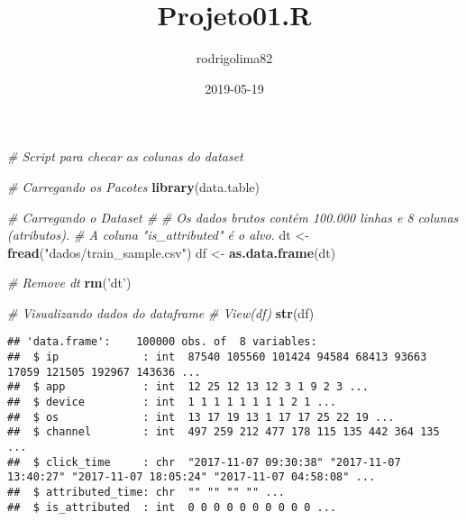 \documentclass[]{article}
\title{Projeto01.R}
\author{rodrigolima82}
\date{2019-05-19}
\newenvironment{Shaded}{\begin{snugshade}}{\end{snugshade}}
\newcommand{\CommentTok}[1]{\textcolor[rgb]{0.56,0.35,0.01}{\textit{#1}}}
\newcommand{\KeywordTok}[1]{\textcolor[rgb]{0.13,0.29,0.53}{\textbf{#1}}}
\newcommand{\NormalTok}[1]{#1}
\newcommand{\StringTok}[1]{\textcolor[rgb]{0.31,0.60,0.02}{#1}}
\begin{document}
\maketitle

\begin{Shaded}
\begin{Highlighting}[]
\CommentTok{# Script para checar as colunas do dataset}

\CommentTok{# Carregando os Pacotes}
\KeywordTok{library}\NormalTok{(data.table)}

\CommentTok{# Carregando o Dataset # }
\CommentTok{# Os dados brutos contém 100.000 linhas e 8 colunas (atributos). }
\CommentTok{# A coluna "is_attributed" é o alvo.}
\NormalTok{dt <-}\StringTok{ }\KeywordTok{fread}\NormalTok{(}\StringTok{"dados/train_sample.csv"}\NormalTok{)}
\NormalTok{df <-}\StringTok{ }\KeywordTok{as.data.frame}\NormalTok{(dt)}

\CommentTok{# Remove dt}
\KeywordTok{rm}\NormalTok{(}\StringTok{'dt'}\NormalTok{)}

\CommentTok{# Visualizando dados do dataframe}
\CommentTok{# View(df)}
\KeywordTok{str}\NormalTok{(df)}
\end{Highlighting}
\end{Shaded}

\begin{verbatim}
## 'data.frame':    100000 obs. of  8 variables:
##  $ ip             : int  87540 105560 101424 94584 68413 93663 17059 121505 192967 143636 ...
##  $ app            : int  12 25 12 13 12 3 1 9 2 3 ...
##  $ device         : int  1 1 1 1 1 1 1 1 2 1 ...
##  $ os             : int  13 17 19 13 1 17 17 25 22 19 ...
##  $ channel        : int  497 259 212 477 178 115 135 442 364 135 ...
##  $ click_time     : chr  "2017-11-07 09:30:38" "2017-11-07 13:40:27" "2017-11-07 18:05:24" "2017-11-07 04:58:08" ...
##  $ attributed_time: chr  "" "" "" "" ...
##  $ is_attributed  : int  0 0 0 0 0 0 0 0 0 0 ...
\end{verbatim}
\end{document}
